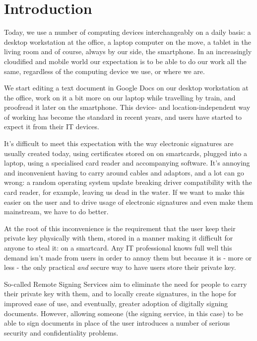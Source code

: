 \chapter{Introduction}
\label{sec:introduction}

Today, we use a number of computing devices interchangeably on a daily basis: a desktop workstation at the office,
a laptop computer on the move, a tablet in the living room and of course, always by our side, the smartphone.
In an increasingly cloudified and mobile world our expectation is to be able to do our work all the same,
regardless of the computing device we use, or where we are.

We start editing a text document in Google Docs on our desktop workstation at the office,
work on it a bit more on our laptop while travelling by train,
and proofread it later on the smartphone.
This device- and location-independent way of working has become the standard in recent years,
and users have started to expect it from their IT devices.

It's difficult to meet this expectation with the way electronic signatures are usually created today,
using certificates stored on on smartcards,
plugged into a laptop,
using a specialised card reader and accompanying software.
It's annoying and inconvenient having to carry around cables and adaptors, and a lot can go wrong:
a random operating system update breaking driver compatibility with the card reader, for example,
leaving us dead in the water.
If we want to make this easier on the user and to drive usage of electronic signatures and even make them mainstream,
we have to do better.

At the root of this inconvenience is the requirement that the user keep their private key physically with them,
stored in a manner making it difficult for anyone to steal it: on a smartcard.
Any IT professional knows full well this demand isn't made from users in order to annoy them but because it is
- more or less - the only practical \textit{and} secure way to have users store their private key.

So-called Remote Signing Services aim to eliminate the need for people to carry their private key with them,
and to locally create signatures,
in the hope for improved ease of use, and eventually, greater adoption of digitally signing documents.
However, allowing someone (the signing service, in this case) to be able to sign documents in place of the user introduces a number of serious security and confidentiality problems.


